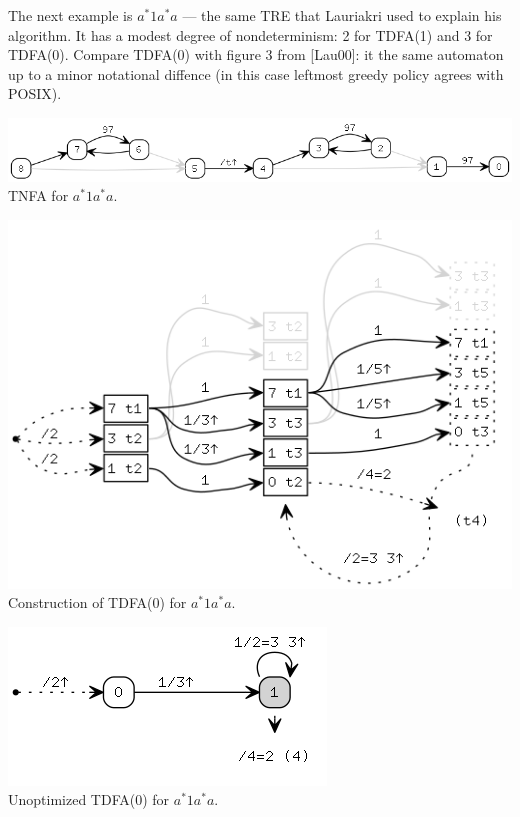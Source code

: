 \documentclass{article}
\theoremstyle{definition}
\begin{document}
\begin{multicols}{2}
The next example is $a^* 1 a^* a$ --- the same TRE that Lauriakri used to explain his algorithm.
It has a modest degree of nondeterminism: 2 for TDFA(1) and 3 for TDFA(0).
Compare TDFA(0) with figure 3 from [Lau00]: it the same automaton up to a minor notational diffence
(in this case leftmost greedy policy agrees with POSIX).
\begin{center}
\includegraphics[width=\linewidth]{img/example2/tnfa.png}\\
\footnotesize{TNFA for $a^* 1 a^* a$.} \\
\end{center}
\begin{center}
\includegraphics[width=0.8\linewidth]{img/example2/tdfa0_raw.png}\\
\footnotesize{Construction of TDFA(0) for $a^* 1 a^* a$.} \\
\end{center}
\begin{center}
\includegraphics[width=0.6\linewidth]{img/example2/tdfa0.png}\\
\footnotesize{Unoptimized TDFA(0) for $a^* 1 a^* a$.} \\
\end{center}

\end{multicols}
\end{document}
